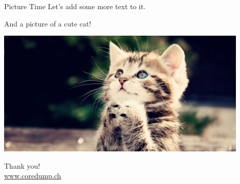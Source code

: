 \documentclass[aspectratio=1610,t]{beamer}
\begin{document}
\begin{frame}{Picture Time}
  Let's add some more text to it.

  And a picture of a cute cat!

  \includegraphics[height=6cm]{cat.jpg}
\end{frame}


{
\begin{frame}[standout]
	\begin{centering}
	{\Huge Thank you!}\\
	{\normalsize \url{www.coredump.ch}}\\
	\end{centering}
\end{frame}
}
\end{document}
